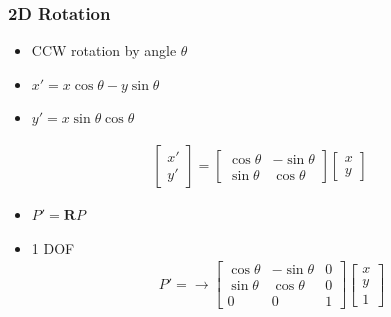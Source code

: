 \documentclass[letterpaper,12pt]{article}
\newcommand{\lra}{\ensuremath{\longrightarrow{}}}
\newcommand{\matr}[1]{\mathbf{#1}}
\begin{document}
\subsubsection{2D Rotation}
\begin{itemize}
 \item CCW rotation by angle $\theta$
 \item $x' = x\cos\theta -y\sin\theta$
 \item $y' = x\sin\theta \cos\theta$
\end{itemize}
\begin{align}
 \begin{bmatrix}
  x' \\
  y'
 \end{bmatrix}
 = \begin{bmatrix}
  \cos\theta & -\sin\theta \\
  \sin\theta & \cos\theta
 \end{bmatrix}
 \begin{bmatrix}
  x \\
  y
 \end{bmatrix}
\end{align}
\begin{itemize}
 \item $P' = \matr{R}P$
 \item 1 DOF
       \begin{align}
        P' = \lra \begin{bmatrix}
         \cos\theta & -\sin\theta & 0 \\
         \sin\theta & \cos\theta  & 0 \\
         0          & 0           & 1
        \end{bmatrix}
        \begin{bmatrix}
         x \\
         y \\
         1
        \end{bmatrix}
       \end{align}
\end{itemize}
\end{document}
